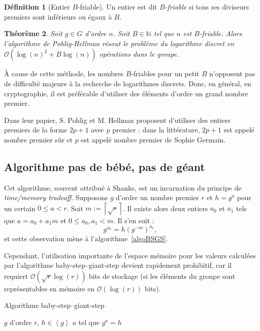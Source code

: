 \documentclass[a4paper, titlepage]{article}
\newtheorem{theo}{Théorème}[section]
\theoremstyle{definition}
\newtheorem{defi}[theo]{Définition}
\theoremstyle{remark}
\def\N{\mathbb N}
\def\O{\mathcal O}
\def\gen #1{\left\langle#1\right\rangle}
\def\ceil #1{\left\lceil#1\right\rceil}
\begin{document}
\begin{defi}[Entier $B$-friable]
Un entier est dit \textit{$B$-friable} si tous ses diviseurs premiers sont inférieurs ou égaux à $B$.
\end{defi}

\begin{theo}
Soit $g \in G$ d'ordre $n$. Soit $B\in\N$ tel que $n$ est $B$-friable. Alors l'algorithme de Pohlig-Hellman résout le problème du logarithme discret en $\O(\log(n)^2 + B\log(n))$ opérations dans le groupe.
\end{theo}

\`A cause de cette méthode, les nombres $B$-friables pour un petit $B$ n'opposent pas de difficulté majeure à la recherche de logarithmes discrets. Donc, en général, en cryptographie, il est préférable d'utiliser des éléments d'ordre un grand nombre premier.

Dans leur papier, S. Pohlig et M. Hellman proposent d'utiliser des entiers premiers de la forme $2p + 1$ avec $p$ premier : dans la littérature, $2p + 1$ est appelé nombre premier sûr et $p$ est appelé nombre premier de Sophie Germain.

\subsection{Algorithme pas de bébé, pas de géant}
\label{BSGS}

Cet algorithme, souvent attribué à Shanks, est un incarnation du principe de \textit{time/memory tradeoff}. Supposons $g$ d'ordre un nombre premier $r$ et $h = g^a$ pour un certain $0 \leqslant a < r$. Soit $m := \ceil{\sqrt{r}}$. Il existe alors deux entiers $a_0$ et $a_1$ tels que $a = a_0 + a_1m$ et $0 \leqslant a_0, a_1 < m$. Il s'en suit :
$$g^{a_0} = h{(g^{-m})}^{a_1},$$
et cette observation mène à l'algorithme~\ref{algoBSGS}.

Cependant, l'utilisation importante de l'espace mémoire pour les valeurs calculées par l'algorithme baby-step--giant-step devient rapidement prohibitif, car il requiert $\O(\sqrt{r}\log(r))$ bits de stockage (si les éléments du groupe sont représentables en mémoire en $\O(\log(r))$ bits).

\begin{algorithm}[h]
\caption{Algorithme baby-step--giant-step}
\label{algoBSGS}
\begin{algorithmic}[1]
\REQUIRE $g$ d'ordre $r$, $h \in \gen{g}$
\ENSURE $a$ tel que $g^a = h$
\STATE{$m \gets \ceil{\sqrt{r}}$}
\ENDFOR
{}
\ENDWHILE
{}
\end{algorithmic}
\end{algorithm}
\end{document}
